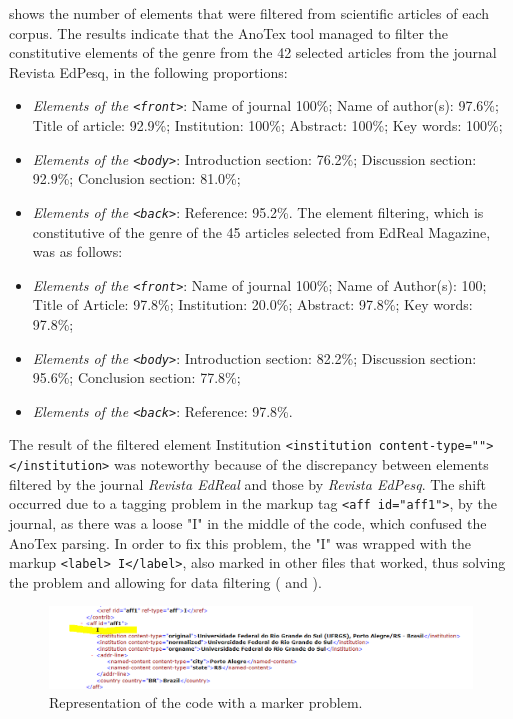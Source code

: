 \documentclass[english]{textolivre}
\begin{document}
 shows the number of elements that were filtered from scientific articles of each corpus. The results indicate that the AnoTex tool managed to filter the constitutive elements of the genre from the 42 selected articles from the journal Revista EdPesq, in the following proportions:

\begin{itemize}
    \item \textit{Elements of the \texttt{<front>}}: Name of journal 100\%; Name of author(s): 97.6\%; Title of article: 92.9\%; Institution: 100\%; Abstract: 100\%; Key words: 100\%;
    \item \textit{Elements of the \texttt{<body>}}: Introduction section: 76.2\%; Discussion section: 92.9\%; Conclusion section: 81.0\%;
    \item \textit{Elements of the \texttt{<back>}}: Reference: 95.2\%.
The element filtering, which is constitutive of the genre of the 45 articles selected from EdReal Magazine, was as follows:
    \item \textit{Elements of the \texttt{<front>}}: Name of journal 100\%; Name of Author(s): 100; Title of Article: 97.8\%; Institution: 20.0\%; Abstract: 97.8\%; Key words: 97.8\%;
    \item \textit{Elements of the \texttt{<body>}}: Introduction section: 82.2\%; Discussion section: 95.6\%; Conclusion section: 77.8\%;
    \item \textit{Elements of the \texttt{<back>}}: Reference: 97.8\%.
\end{itemize}

The result of the filtered element Institution \texttt{<institution content-type=""> </institution>} was noteworthy because of the discrepancy between elements filtered by the journal \textit{Revista EdReal} and those by \textit{Revista EdPesq}. The shift occurred due to a tagging problem in the markup tag \texttt{<aff id="aff1">}, by the journal, as there was a loose "I" in the middle of the code, which confused the AnoTex parsing. In order to fix this problem, the "I" was wrapped with the markup \texttt{<label> I</label>}, also marked in other files that worked, thus solving the problem and allowing for data filtering ( and ).

\begin{figure}[htbp]
 \centering
 \includegraphics[width=\textwidth]{Fig7.png}
 \caption{Representation of the code with a marker problem.}
 \label{fig-07}
\end{figure}
\end{document}
